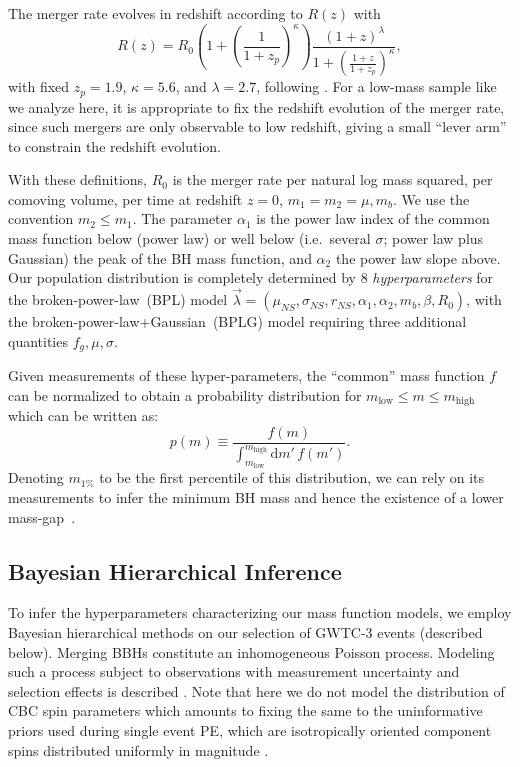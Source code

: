 \documentclass[modern]{aastex631}
\newcommand{\dd}{\ensuremath{\mathrm{d}}}
\begin{document}
The merger rate evolves in redshift according to $R(z)$ with 
\begin{equation}
    R(z) = R_0 \left( 1 + \left( \frac{1}{1 + z_p} \right)^\kappa \right) \frac{\left( 1 + z \right)^\lambda}{1 + \left( \frac{1+z}{1+z_p} \right)^\kappa}, 
\end{equation}
with fixed $z_p = 1.9$, $\kappa = 5.6$, and $\lambda = 2.7$, following
\citet{Madau2014}.  For a low-mass sample like we analyze here, it is
appropriate to fix the redshift evolution of the merger rate, since such mergers
are only observable to low redshift, giving a small ``lever arm'' to constrain
the redshift evolution.

With these definitions, $R_0$ is the merger rate per natural log mass squared,
per comoving volume, per time at redshift $z = 0$, $m_1 = m_2 = \mu, m_b$.  We
use the convention $m_2 \leq m_1$.  The parameter $\alpha_1$ is the power law
index of the common mass function below (power law) or well below (i.e.\ several
$\sigma$; power law plus Gaussian) the peak of the BH mass function, and
$\alpha_2$ the power law slope above.  Our population distribution is completely
determined by 8 \textit{hyperparameters} for the broken-power-law~(BPL) model
$\vec{\lambda}=(\mu_{NS}, \sigma_{NS}, r_{NS}, \alpha_1,\alpha_2,m_b, \beta,
R_0)$, with the broken-power-law+Gaussian~(BPLG) model requiring three
additional quantities $f_g,\mu,\sigma$.

Given measurements of these hyper-parameters, the ``common'' mass function $f$ can be normalized to obtain a probability distribution
for $m_\mathrm{low} \leq m \leq m_\mathrm{high}$ which can be written as:
\begin{equation}
    \label{eq:pm-definition}
    p(m) \equiv \frac{f(m)}{\int_{m_\mathrm{low}}^{m_\mathrm{high}} \dd m' \, f(m')}.
\end{equation}
\noindent Denoting $m_{1\%}$ to be the first percentile of this distribution, we can rely on its measurements to infer the minimum BH mass and hence the existence of a lower mass-gap~\citep{Farr:2010tu}. 

\subsection{Bayesian Hierarchical Inference}
\noindent

To infer the hyperparameters characterizing our mass function models, we employ
Bayesian hierarchical methods on our selection of GWTC-3 events (described
below). Merging BBHs constitute an inhomogeneous Poisson
process.  Modeling such a process subject to observations with
measurement uncertainty and selection effects is described
\citet{Mandel:2018mve,pop-vitale,popgw2,popgw3}.
Note that here we do not model the distribution of CBC spin parameters which
amounts to fixing the same to the uninformative priors used during single event
PE, which are isotropically oriented component spins distributed uniformly in
magnitude \citep{KAGRA:2021duu}.  
\end{document}
